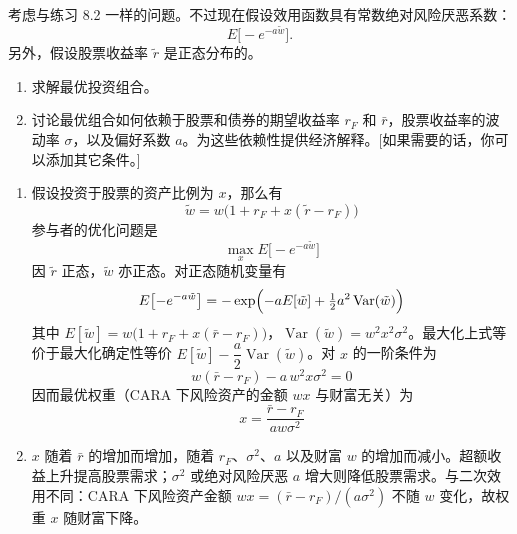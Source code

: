 \begin{problem}
 考虑与练习 8.2 一样的问题。不过现在假设效用函数具有常数绝对风险厌恶系数：
\[
    E\bigl[-e^{-a\tilde{w}}\bigr].
\]
另外，假设股票收益率 $\tilde{r}$ 是正态分布的。
\begin{enumerate}[label=(\alph*)]
    \item 求解最优投资组合。
    \item 讨论最优组合如何依赖于股票和债券的期望收益率 $r_{F}$ 和 $\bar{r}$，股票收益率的波动率 $\sigma$，以及偏好系数 $a$。为这些依赖性提供经济解释。[如果需要的话，你可以添加其它条件。]
\end{enumerate}
\end{problem}
\begin{solution}
\begin{enumerate}[label=(\alph*)]
    \item 假设投资于股票的资产比例为 $x$，那么有
    \[
        \tilde{w}=w\bigl(1+r_{F}+x(\tilde{r}-r_{F})\bigr)
    \]
    参与者的优化问题是
    \[
        \max_{x}E\bigl[-e^{-a\tilde{w}}\bigr]
    \]
    因 $\tilde{r}$ 正态，$\tilde{w}$ 亦正态。对正态随机变量有
    \[
        E\bigl[-e^{-a\tilde{w}}\bigr]=-\exp\Bigl(-aE[\tilde{w}]+\tfrac12 a^{2}\operatorname{Var}(\tilde{w})\Bigr)
    \]
    其中 $E[\tilde{w}]=w\bigl(1+r_{F}+x(\bar{r}-r_{F})\bigr)$，$\operatorname{Var}(\tilde{w})=w^{2}x^{2}\sigma^{2}$。最大化上式等价于最大化确定性等价 $E[\tilde{w}]-\dfrac{a}{2}\operatorname{Var}(\tilde{w})$。对 $x$ 的一阶条件为
    \[
        w(\bar{r}-r_{F})-a\,w^{2}x\sigma^{2}=0
    \]
    因而最优权重（CARA 下风险资产的金额 $wx$ 与财富无关）为
    \[
        x=\frac{\bar{r}-r_{F}}{aw\sigma^{2}}
    \]
    \item $x$ 随着 $\bar{r}$ 的增加而增加，随着 $r_{F}$、$\sigma^{2}$、$a$ 以及财富 $w$ 的增加而减小。超额收益上升提高股票需求；$\sigma^{2}$ 或绝对风险厌恶 $a$ 增大则降低股票需求。与二次效用不同：CARA 下风险资产金额 $wx=(\bar{r}-r_{F})/(a\sigma^{2})$ 不随 $w$ 变化，故权重 $x$ 随财富下降。
\end{enumerate}
\end{solution}

